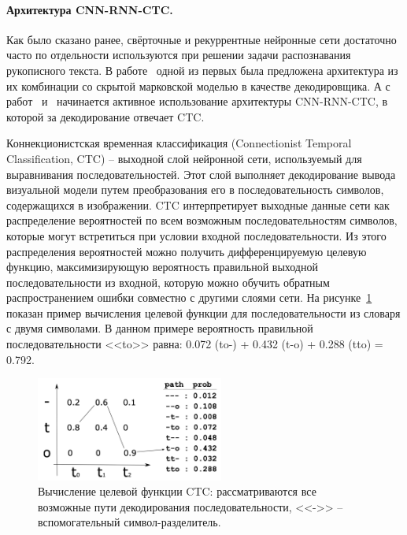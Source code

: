 \paragraph{Архитектура CNN-RNN-CTC.}{
    Как было сказано ранее, свёрточные и рекуррентные нейронные сети достаточно часто по отдельности используются
    при решении задачи распознавания рукописного текста.
    В работе~\cite{suryani2016benefits} одной из первых была предложена архитектура из их комбинации
    со скрытой марковской моделью в качестве декодировщика.
    А с работ~\cite{bluche2017gated} и~\cite{puigcerver2017multidimensional} начинается активное
    использование архитектуры CNN-RNN-CTC, в которой за декодирование отвечает CTC.

    Коннекционистская временная классификация (Connectionist Temporal Classification, CTC) -- выходной слой нейронной сети,
    используемый для выравнивания последовательностей.
    Этот слой выполняет декодирование вывода визуальной модели путем преобразования его в последовательность символов, содержащихся в изображении.
    CTC интерпретирует выходные данные сети как распределение вероятностей по всем возможным последовательностям символов,
    которые могут встретиться при условии входной последовательности.
    Из этого распределения вероятностей можно получить дифференцируемую целевую функцию, максимизирующую вероятность
    правильной выходной последовательности из входной, которую можно обучить обратным распространением ошибки совместно с другими слоями сети.
    На рисунке~\ref{fig:ctc} показан пример вычисления целевой функции для последовательности из словаря с двумя символами.
    В данном примере вероятность правильной последовательности <<to>> равна: 0.072 (to-) + 0.432 (t-o) + 0.288 (tto) = 0.792.

    \begin{figure}[h!]
        \centering
        \includegraphics[width=0.55\textwidth]{img/ctc}
        \caption{Вычисление целевой функции CTC: рассматриваются все возможные пути декодирования последовательности,
            <<->> -- вспомогательный символ-разделитель.}
        \label{fig:ctc}
    \end{figure}

}
